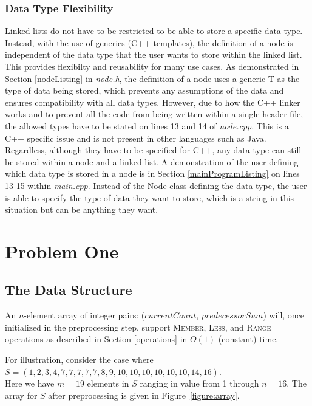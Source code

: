 \documentclass[letterpaper, 10pt,DIV=13]{scrartcl}
\numberwithin{equation}{section} %
\numberwithin{figure}{section} %
\numberwithin{table}{section} %
\begin{document}
\subsubsection{Data Type Flexibility}
Linked lists do not have to be restricted to be able to store a specific data type. Instead, with the use of generics (C++ templates), the definition of a node is
independent of the data type that the user wants to store within the linked list. This provides flexibilty and reusability for many use cases. As demonstrated in
Section \ref{nodeListing} in \textit{node.h}, the definition of a node uses a generic T as the type of data being stored, which prevents any assumptions of the data
and ensures compatibility with all data types. However, due to how the C++ linker works and to prevent all the code from being written within a single header file,
the allowed types have to be stated on lines 13 and 14 of \textit{node.cpp}. This is a C++ specific issue and is not present in other languages such as Java.
Regardless, although they have to be specified for C++, any data type can still be stored within a node and a linked list. A demonstration of the user defining
which data type is stored in a node is in Section \ref{mainProgramListing} on lines 13-15 within \textit{main.cpp}. Instead of the Node class defining the data type,
the user is able to specify the type of data they want to store, which is a string in this situation but can be anything they want.

\section{Problem One}

\subsection{The Data Structure}
An $n$-element array of integer pairs: ($currentCount$, $predecessorSum$) will, once initialized in the preprocessing step,  support \textsc{Member}, \textsc{Less}, and \textsc{Range} operations as described in Section \ref{operations} in $O(1)$ (constant) time.

For illustration, consider the case where $S = (1, 2, 3, 4, 7, 7, 7, 7, 7, 8, 9, 10, 10,10,10,10,10, 14, 16)$. \\
Here we have $m = 19$ elements in $S$ ranging in value from 1 through $n = 16$.
The array for $S$ after preprocessing is given in Figure~\ref{figure:array}.
\end{document}
